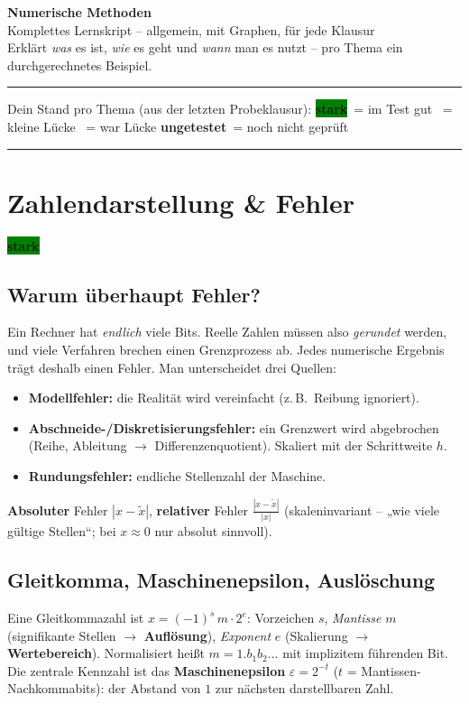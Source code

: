 \documentclass[a4paper,11pt]{article}
\newcommand{\chip}[2]{{\setlength{\fboxsep}{2.5pt}\colorbox{#1}{\color{bgdark}\footnotesize\bfseries #2}}}
\newcommand{\stark}{\chip{green}{stark}}
\newcommand{\teils}{\chip{yellow}{teils}}
\newcommand{\ueben}{\chip{rose}{üben!}}
\newcommand{\offen}{\chip{muted}{ungetestet}}
\begin{document}
\begin{center}
{\Huge\bfseries\color{accent} Numerische Methoden}\\[3pt]
{\large\color{fgtext} Komplettes Lernskript -- allgemein, mit Graphen, für jede Klausur}\\[3pt]
{\small\color{muted} Erklärt \emph{was} es ist, \emph{wie} es geht und \emph{wann} man es nutzt -- pro Thema ein durchgerechnetes Beispiel.}
\end{center}
\vspace{2pt}
\noindent\textcolor{rulecol}{\rule{\linewidth}{0.4pt}}

{\small\color{muted}Dein Stand pro Thema (aus der letzten Probeklausur):\quad
\stark\ = im Test gut \quad \teils\ = kleine Lücke \quad \ueben\ = war Lücke \quad
\offen\ = noch nicht geprüft}

{\color{muted}\tableofcontents}
\noindent\textcolor{rulecol}{\rule{\linewidth}{0.4pt}}

\section{Zahlendarstellung \& Fehler}
\stark

\subsection{Warum überhaupt Fehler?}
Ein Rechner hat \emph{endlich} viele Bits. Reelle Zahlen müssen also \emph{gerundet} werden, und
viele Verfahren brechen einen Grenzprozess ab. Jedes numerische Ergebnis trägt deshalb einen Fehler.
Man unterscheidet drei Quellen:
\begin{itemize}
\item \textbf{Modellfehler:} die Realität wird vereinfacht (z.\,B.\ Reibung ignoriert).
\item \textbf{Abschneide-/Diskretisierungsfehler:} ein Grenzwert wird abgebrochen (Reihe, Ableitung
  $\to$ Differenzenquotient). Skaliert mit der Schrittweite $h$.
\item \textbf{Rundungsfehler:} endliche Stellenzahl der Maschine.
\end{itemize}
\textbf{Absoluter} Fehler $|x-\tilde x|$, \textbf{relativer} Fehler $\frac{|x-\tilde x|}{|x|}$
(skaleninvariant -- „wie viele gültige Stellen``; bei $x\approx 0$ nur absolut sinnvoll).

\subsection{Gleitkomma, Maschinenepsilon, Auslöschung}
Eine Gleitkommazahl ist $x=(-1)^s\,m\cdot 2^{e}$: Vorzeichen $s$, \emph{Mantisse} $m$ (signifikante
Stellen $\to$ \textbf{Auflösung}), \emph{Exponent} $e$ (Skalierung $\to$ \textbf{Wertebereich}).
Normalisiert heißt $m=1{.}b_1b_2\dots$ mit implizitem führenden Bit. Die zentrale Kennzahl ist das
\textbf{Maschinenepsilon} $\varepsilon=2^{-t}$ ($t$ = Mantissen-Nachkommabits): der Abstand von $1$
zur nächsten darstellbaren Zahl.
\end{document}
